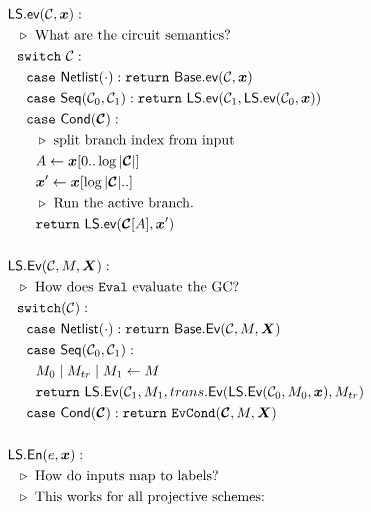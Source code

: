 \begin{figure}
  \begin{adjustwidth}{-0.1\textwidth}{-0.1\textwidth}
  \centering
  \begin{minipage}[t]{0.56\linewidth}
    \begin{align*}
      &\ourscheme.\gev(\cir, \cirinp):\\
      &~~\codecomment{What are the circuit semantics?}\\
      &~~\switch~\cir:\\
      &~~~~\ccase~\netlist(\cdot): \creturn~\underscheme.\gev(\cir, \cirinp)\\
      &~~~~\ccase~\sequential(\cir_0, \cir_1):
      \creturn~\ourscheme.\gev(\cir_1, \ourscheme.\gev(\cir_0,
      \cirinp))\\
      &~~~~\ccase~\conditional(\vec{\cir}):\\
      &~~~~~~\codecomment{split branch index from input}\\
      &~~~~~~\aid \gets \cirinp[0..\log |\vec \cir|]\\
      &~~~~~~\cirinp' \gets \cirinp[\log |\vec \cir|..]\\
      &~~~~~~\codecomment{Run the active branch.}\\
      &~~~~~~\creturn~\ourscheme.\gev(\vec{\cir}[\aid], \cirinp')\\
      \\
      &\ourscheme.\gEv(\cir,\mat,\gcirinp):\\
      &~~\codecomment{How does \E evaluate the GC?}\\
      &~~\switch(\cir):\\
      &~~~~\ccase~\netlist(\cdot): \creturn~\underscheme.\gEv(\cir,\mat,\gcirinp)\\
      &~~~~\ccase~\sequential(\cir_0, \cir_1): \\
      &~~~~~~\mat_0\mid\mat_{tr}\mid\mat_1 \gets \mat\\
      &~~~~~~\creturn~\ourscheme.\gEv(\cir_1, \mat_1, \evtranslate(\ourscheme.\gEv(\cir_0, \mat_0, \cirinp), \mat_{tr})\\
      &~~~~\ccase~\conditional(\vec \cir): \creturn~\evcond(\vec \cir,
      \mat, \gcirinp)\\
      \\
      &\ourscheme.\gEn(e,\cirinp):\\
      &~~\codecomment{How do inputs map to labels?}\\
      &~~\codecomment{This works for all projective schemes:}\\

\end{align*}
\end{minipage}
\end{adjustwidth}
\end{figure}
